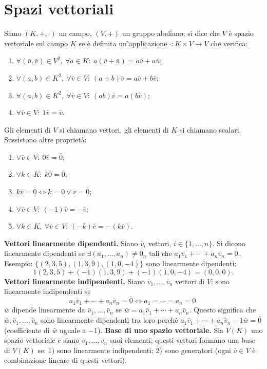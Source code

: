 \documentclass[11pt,a4paper]{article}
\newcommand{\pagina}[1]{\clearpage}
\begin{document}
\section*{Spazi vettoriali}
Siano $(K,+,\cdot)$ un campo, $(V,+)$ un gruppo abeliano; si dice che $V$ è spazio vettoriale sul campo $K$ se è definita un'applicazione $\cdot:K\times V\to V$ che verifica:
\begin{enumerate}
\item $\forall(\bar u,\bar v)\in V^2,\ \forall a\in K:\ a(\bar v+\bar u)=a\bar v+a\bar u$;
\item $\forall(a,b)\in K^2,\ \forall\bar v\in V:\ (a+b)\bar v=a\bar v+b\bar v$;
\item $\forall(a,b)\in K^2,\ \forall\bar v\in V:\ (ab)\bar v=a(b\bar v)$;
\item $\forall\bar v\in V:\ 1\bar v=\bar v$.
\end{enumerate}
Gli elementi di $V$ si chiamano vettori, gli elementi di $K$ si chiamano scalari. Sussistono altre proprietà:
\begin{enumerate}\item $\forall\bar v\in V:\ 0\bar v=\bar0$;
\item $\forall k\in K:\ k\bar0=\bar0$;
\item $k\bar v=\bar0\Longleftrightarrow k=0\vee\bar v=\bar0$;
\item $\forall\bar v\in V:\ (-1)\bar v=-\bar v$;
\item $\forall k\in K,\ \forall\bar v\in V:\ (-k)\bar v=-(k\bar v)$.
\end{enumerate}
\textbf{Vettori linearmente dipendenti.} Siano $\bar v_i$ vettori, $i\in\{1,\ldots,n\}$. Si dicono linearmente dipendenti se $\exists(a_1,\ldots,a_n)\ne\bar0_n$ tali che $a_1\bar v_1+\cdots+a_n\bar v_n=\bar0$.
Esempio: $\{(2,3,5),(1,3,9),(1,0,-4)\}$ sono linearmente dipendenti:
\[1(2,3,5)+(-1)(1,3,9)+(-1)(1,0,-4)=(0,0,0).\]
\pagina{31}
\textbf{Vettori linearmente indipendenti.} Siano $\bar v_1,\ldots,\bar v_n$ vettori di $V$: sono linearmente indipendenti se
\[a_1\bar v_1+\cdots+a_n\bar v_n=\bar0\Longleftrightarrow a_1=\cdots=a_n=0.\]
$\bar w$ dipende linearmente da $\bar v_1,\ldots,\bar v_n$ se $\bar w=a_1\bar v_1+\cdots+a_n\bar v_n$. Questo significa che $\bar w,\bar v_1,\ldots,\bar v_n$ sono linearmente dipendenti tra loro perché $a_1\bar v_1+\cdots+a_n\bar v_n-1\bar w=\bar0$ (coefficiente di $\bar w$ uguale a $-1$).
\textbf{Base di uno spazio vettoriale.} Sia $V(K)$ uno spazio vettoriale e siano $\bar v_1,\ldots,\bar v_n$ suoi elementi; questi vettori formano una base di $V(K)$ se: 1) sono linearmente indipendenti; 2) sono generatori (ogni $\bar v\in V$ è combinazione lineare di questi vettori).
\end{document}
